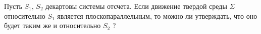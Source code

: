 Пусть $S_{1}$, $S_{2}$  декартовы системы отсчета. Если движение твердой среды $\Sigma$
относительно $S_{1}$ является плоскопараллельным, то можно ли утверждать,
что оно будет таким же и относительно $S_{2}$ ?
